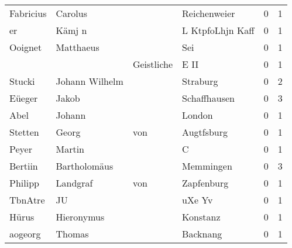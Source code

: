 \begin{tabular}{llllrr}
                Fabricius &                            Carolus &             &                                Reichenweier &          0 &         1 \\
                       er &                             Kämj n &             &                            L KtpfoLhjn Kaff &          0 &         1 \\
                  Ooignet &                          Matthaeus &             &                                         Sei &          0 &         1 \\
                          &                                    &  Geistliche &                                        E II &          0 &         1 \\
                   Stucki &                     Johann Wilhelm &             &                                    Straburg &          0 &         2 \\
                   Eüeger &                              Jakob &             &                                Schaffhausen &          0 &         3 \\
                     Abel &                             Johann &             &                                      London &          0 &         1 \\
                  Stetten &                              Georg &         von &                                  Augtfsburg &          0 &         1 \\
                    Peyer &                             Martin &             &                                           C &          0 &         1 \\
                  Bertiin &                       Bartholomäus &             &                                   Memmingen &          0 &         3 \\
                  Philipp &                           Landgraf &         von &                                  Zapfenburg &          0 &         1 \\
                  TbnAtre &                                 JU &             &                                      uXe Yv &          0 &         1 \\
                    Hürus &                         Hieronymus &             &                                    Konstanz &          0 &         1 \\
                  aogeorg &                             Thomas &             &                                    Backnang &          0 &         1 \\

\end{tabular}
